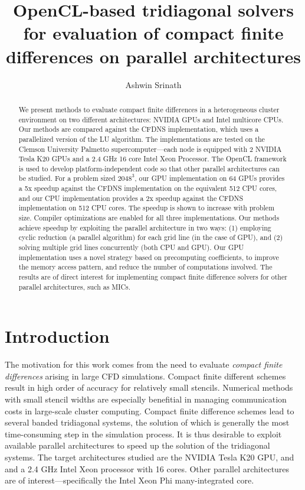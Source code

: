 \documentclass{article}
\author{Ashwin Srinath}
\title{OpenCL-based tridiagonal solvers for evaluation
    of compact finite differences on parallel architectures}
\begin{document}
\renewcommand{\refname}{References}

\maketitle


\begin{abstract}
    We present methods to evaluate compact finite differences in a
    heterogeneous cluster environment
    on two different architectures: NVIDIA GPUs and Intel multicore CPUs.
    Our methods are compared against the CFDNS implementation,
    which uses a parallelized version of the LU algorithm.
    The implementations are tested on the Clemson University Palmetto supercomputer---each
    node is equipped with 2 NVIDIA Tesla K20 GPUs and a
    2.4 GHz 16 core Intel Xeon Processor.
    The OpenCL framework is used to develop platform-independent code
    so that other parallel architectures can be studied.
    For a problem sized $2048^{3}$,
    our GPU implementation on 64 GPUs provides a
    5x speedup against the CFDNS implementation on the equivalent 512 CPU cores,
    and our CPU implementation provides a 2x speedup against
    the CFDNS implementation on 512 CPU cores.
    The speedup is shown to increase with problem size.
    Compiler optimizations are enabled for all three implementations.
    Our methods achieve speedup by exploiting the parallel architecture in two ways:
    (1) employing cyclic reduction (a parallel algorithm) for each grid line (in the case of GPU), and
    (2) solving multiple grid lines concurrently (both CPU and GPU).
    Our GPU implementation uses a novel strategy
    based on precomputing coefficients,
    to improve the memory access pattern,
    and reduce the number of computations involved.
    The results are of direct interest for implementing compact finite difference
    solvers for other parallel architectures, such as MICs.


\end{abstract}


\section{Introduction}

    The motivation for this work comes from the need to evaluate
    \emph{compact finite differences} arising in large CFD simulations.
    Compact finite different schemes result in
    high order of accuracy for relatively small stencils.
    Numerical methods with small stencil widths are especially benefitial
    in managing communication costs in large-scale cluster computing.
    Compact finite difference schemes lead to
    several banded tridiagonal systems,
    the solution of which is generally the most time-consuming step in the simulation process.
    It is thus desirable to exploit available parallel architectures to speed up
    the solution of the tridiagonal systems.
    The target architectures studied are the NVIDIA Tesla K20 GPU,
    and and a 2.4 GHz Intel Xeon processor with 16 cores.
    Other parallel architectures are of interest---specifically the
    Intel Xeon Phi many-integrated core.
\end{document}
